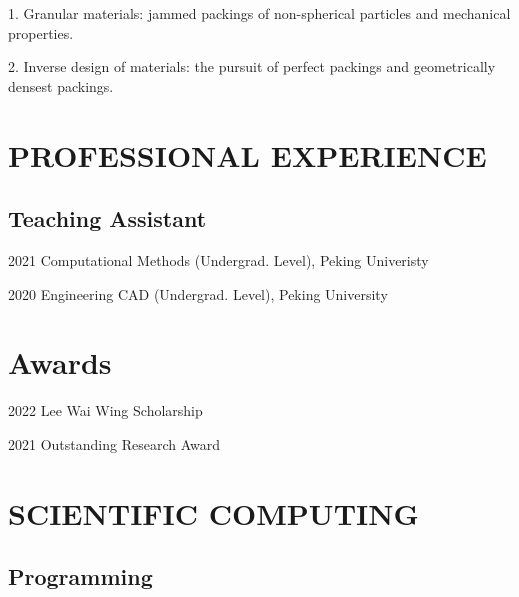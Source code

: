 \documentclass[12pt,letterpaper]{report}
\newcommand{\listitemspace}{0.25em}
\renewenvironment{itemize}
{\begin{list}{}{\setlength{\leftmargin}{0em}
                \setlength{\parskip}{0em}
                \setlength{\itemsep}{\listitemspace}
                \setlength{\parsep}{\listitemspace}}}
{\end{list}}
\begin{document}
    \begin{itemize}

        \item 1. Granular materials: jammed packings of non-spherical particles and mechanical properties.
        \item 2. Inverse design of materials: the pursuit of perfect packings and geometrically densest packings.

    \end{itemize}



    \section*{PROFESSIONAL EXPERIENCE}
    
    \subsection*{Teaching Assistant}
    
    \begin{tablist}
    	
    	\item[2021] \tab{}Computational Methods (Undergrad. Level), Peking Univeristy
    	
    	\item[2020] \tab{}Engineering CAD (Undergrad. Level), Peking University
    	
    \end{tablist}
	
	\section*{Awards}
	
	\begin{tablist}
		
		\item[2022] \tab{}Lee Wai Wing Scholarship
		
		\item[2021] \tab{}Outstanding Research Award
		
	\end{tablist}
	
	
	\section*{SCIENTIFIC COMPUTING}
	
	\subsection*{ Programming}
	
\end{document}

